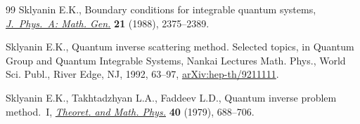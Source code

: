\documentclass[11pt]{article}
\numberwithin{equation}{section}
\numberwithin{equation}{section}
\begin{document}
\begin{thebibliography}{99}
Sklyanin E.K., Boundary conditions for integrable quantum systems,
 \href{https://doi.org/10.1088/0305-4470/21/10/015}{\textit{J.~Phys.~A: Math. Gen.}} \textbf{21} (1988), 2375--2389.

Sklyanin E.K., Quantum inverse scattering method. {S}elected topics, in Quantum
 Group and Quantum Integrable Systems, Nankai Lectures Math. Phys., World Sci.
 Publ., River Edge, NJ, 1992, 63--97, \href{https://arxiv.org/abs/hep-th/9211111}{arXiv:hep-th/9211111}.

Sklyanin E.K., Takhtadzhyan L.A., Faddeev L.D., Quantum inverse problem
 method.~{I}, \href{https://doi.org/10.1007/BF01018718}{\textit{Theoret. and Math. Phys.}} \textbf{40} (1979), 688--706.

\end{thebibliography}
\end{document}
